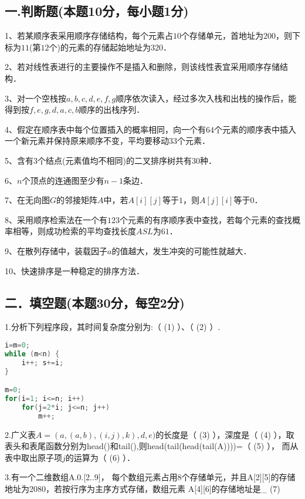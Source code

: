 
\subsection{一.判断题(本题10分，每小题1分)}

1、若某顺序表采用顺序存储结构，每个元素占$10$个存储单元，首地址为$200$，则下标为$11$(第$12$个)的元素的存储起始地址为$320$．

2、若对线性表进行的主要操作不是插入和删除，则该线性表宜采用顺序存储结构．

3、对一个空栈按$a,b,c,d,e,f,g$顺序依次读入，经过多次入栈和出栈的操作后，能得到按$f,e,g,d,a,c,b$顺序的出栈序列．

4、假定在顺序表中每个位置插入的概率相同，向一个有$64$个元素的顺序表中插入一个新元素并保持原来顺序不变，平均要移动$33$个元素．

5、含有$3$个结点(元素值均不相同)的二叉排序树共有$30$种．

6、$n$个顶点的连通图至少有$n-1$条边．

7、在无向图$G$的邻接矩阵$A$中，若$A[i][j]$等于$1$，则$A[j][i]$等于$0$．

8、采用顺序检索法在一个有$123$个元素的有序顺序表中查找，若每个元素的查找概率相等，则成功检索的平均查找长度$ASL$为$61$．

9、在散列存储中，装载因子$a$的值越大，发生冲突的可能性就越大．

10、快速排序是一种稳定的排序方法．

\subsection{二．填空题(本题30分，每空2分)}

1.分析下列程序段，其时间复杂度分别为:（ (1) ）、（ (2) ）.
\begin{lstlisting}[language=cpp]
i=m=0;
while (m<n) {
    i++; s+=i;
}

m=0;
for(i=1; i<=n; i++)
    for(j=2*i; j<=n; j++)
        m++;
\end{lstlisting}

2.广义表$A=(a, (a, b), (i,j),k),d,e)$的长度是（ (3) ），深度是（ (4) ），取表头和表尾函数分别为head()和tail(),则head(tail(head(tail(A))))=（ (5) ）， 而从表中取出原子项$j$的运算为（ (6) ）．

3.有一个二维数组A.0.[2..9]， 每个数组元素占用8个存储单元，并且A[2][5]的存储地址为2080，若按行序为主序方式存储，数组元素 A[4][6]的存储地址是\_ (7)

